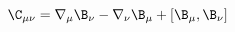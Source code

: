 \begin{equation}
\label{e5:34}
\C_{\mu \nu}=\nabla_{\mu}\B_{\nu}-\nabla_{\nu}\B_{\mu}+[\B_{\mu},\B_{\nu}]
\end{equation}

